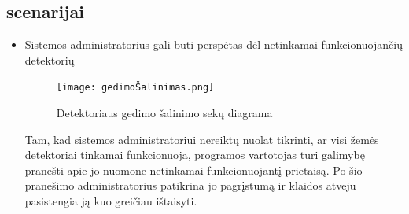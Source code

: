 \documentclass[oneside]{VUMIFPSkursinis}
\begin{document}
\subsection{scenarijai}
\begin{itemize}
\item Sistemos administratorius gali būti perspėtas dėl netinkamai funkcionuojančių detektorių
\begin{figure}[H]
		\centering	
	\texttt{[image: gedimoŠalinimas.png]}
	\caption{Detektoriaus gedimo šalinimo sekų diagrama}
	\label{fig:gedimoŠalinimas}
	\end{figure}
	Tam, kad sistemos administratoriui nereiktų nuolat tikrinti, ar visi žemės detektoriai tinkamai funkcionuoja, programos vartotojas turi galimybę pranešti apie jo nuomone netinkamai funkcionuojantį prietaisą. Po šio pranešimo administratorius patikrina jo pagrįstumą ir klaidos atveju pasistengia ją kuo greičiau ištaisyti.
\end{itemize}
\end{document}
